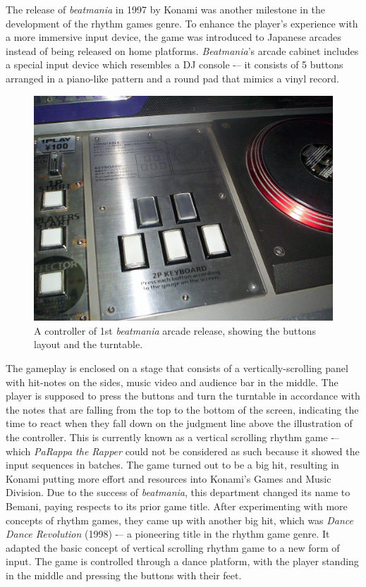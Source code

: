 The release of \textit{beatmania} in 1997 by Konami was another milestone in the development of the rhythm games genre. To enhance the player's experience with a more immersive input device, the game was introduced to Japanese arcades instead of being released on home platforms. \textit{Beatmania}'s arcade cabinet includes a special input device which resembles a DJ console -– it consists of 5 buttons arranged in a piano-like pattern and a round pad that mimics a vinyl record.

\begin{figure}[h]
    \centering\includegraphics[scale=0.25]{obrazki/beatmaniacontrols.jpg}
    \caption{A controller of 1st \textit{beatmania} arcade release, showing the buttons layout and the turntable. \cite{beatmaniacontrols}}
    \label{fig:beatmania_controls}
\end{figure}

The gameplay is enclosed on a stage that consists of a vertically-scrolling panel with hit-notes on the sides, music video and audience bar in the middle. The player is supposed to press the buttons and turn the turntable in accordance with the notes that are falling from the top to the bottom of the screen, indicating the time to react when they fall down on the judgment line above the illustration of the controller. This is currently known as a vertical scrolling rhythm game -– which \textit{PaRappa the Rapper} could not be considered as such because it showed the input sequences in batches. The game turned out to be a big hit, resulting in Konami putting more effort and resources into Konami's Games and Music Division. Due to the success of \textit{beatmania}, this department changed its name to Bemani, paying respects to its prior game title. \cite{faresplayingmusic} After experimenting with more concepts of rhythm games, they came up with another big hit, which was \textit{Dance Dance Revolution} (1998) -– a pioneering title in the rhythm game genre. It adapted the basic concept of vertical scrolling rhythm game to a new form of input. The game is controlled through a dance platform, with the player standing in the middle and pressing the buttons with their feet.

